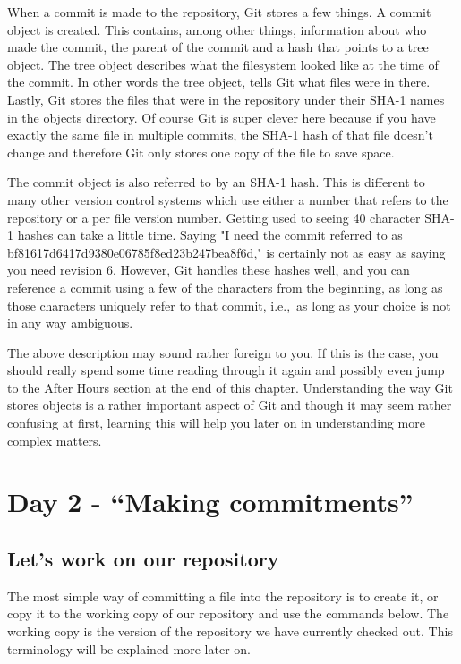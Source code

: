 When a commit is made to the repository, Git stores a few things.
A commit object is created.
This contains, among other things, information about who made the commit, the parent of the commit and a hash that points to a tree object.
The tree object describes what the filesystem looked like at the time of the commit.
In other words the tree object, tells Git what files were in there.
Lastly, Git stores the files that were in the repository under their SHA-1 names in the objects directory.
Of course Git is super clever here because if you have exactly the same file in multiple commits, the SHA-1 hash of that file doesn't change and therefore Git only stores one copy of the file to save space.

The commit object is also referred to by an SHA-1 hash.
This is different to many other version control systems which use either a number that refers to the repository or a per file version number.
Getting used to seeing 40 character SHA-1 hashes can take a little time.
Saying "I need the commit referred to as bf81617d6417d9380e06785f8ed23b247bea8f6d," is certainly not as easy as saying you need revision 6.
However, Git handles these hashes well, and you can reference a commit using a few of the characters from the beginning, as long as those characters uniquely refer to that commit, i.e.,\ as long as your choice is not in any way ambiguous.

The above description may sound rather foreign to you.
If this is the case, you should really spend some time reading through it again and possibly even jump to the After Hours section at the end of this chapter.
Understanding the way Git stores objects is a rather important aspect of Git and though it may seem rather confusing at first,
learning this will help you later on in understanding more complex matters.

\section{Day 2 - ``Making commitments''}
\subsection{Let's work on our repository}
The most simple way of committing a file into the repository is to create it, or copy it to the working copy of our repository and use the commands below.
The working copy is the version of the repository we have currently checked out.
This terminology will be explained more later on.

